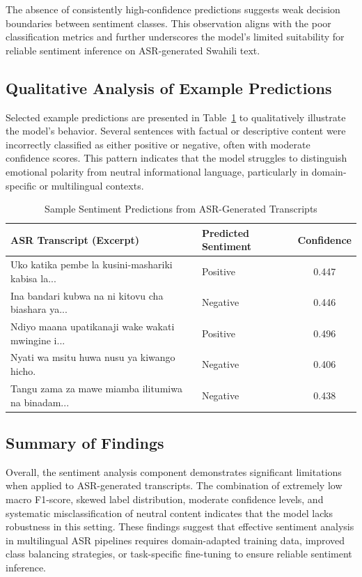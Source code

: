 The absence of consistently high-confidence predictions suggests weak decision boundaries between sentiment classes. This observation aligns with the poor classification metrics and further underscores the model’s limited suitability for reliable sentiment inference on ASR-generated Swahili text.

\subsection{Qualitative Analysis of Example Predictions}

Selected example predictions are presented in Table~\ref{tab:example_predictions} to qualitatively illustrate the model’s behavior. Several sentences with factual or descriptive content were incorrectly classified as either positive or negative, often with moderate confidence scores. This pattern indicates that the model struggles to distinguish emotional polarity from neutral informational language, particularly in domain-specific or multilingual contexts.

\begin{table}[H]
\centering
\caption{Sample Sentiment Predictions from ASR-Generated Transcripts}
\label{tab:example_predictions}
\begin{tabular}{p{7cm} l c}
\hline
\textbf{ASR Transcript (Excerpt)} & \textbf{Predicted Sentiment} & \textbf{Confidence} \\
\hline
Uko katika pembe la kusini-mashariki kabisa la... & Positive & 0.447 \\
Ina bandari kubwa na ni kitovu cha biashara ya... & Negative & 0.446 \\
Ndiyo maana upatikanaji wake wakati mwingine i... & Positive & 0.496 \\
Nyati wa msitu huwa nusu ya kiwango hicho. & Negative & 0.406 \\
Tangu zama za mawe miamba ilitumiwa na binadam... & Negative & 0.438 \\
\hline
\end{tabular}
\end{table}


\subsection{Summary of Findings}

Overall, the sentiment analysis component demonstrates significant limitations when applied to ASR-generated transcripts. The combination of extremely low macro F1-score, skewed label distribution, moderate confidence levels, and systematic misclassification of neutral content indicates that the model lacks robustness in this setting. These findings suggest that effective sentiment analysis in multilingual ASR pipelines requires domain-adapted training data, improved class balancing strategies, or task-specific fine-tuning to ensure reliable sentiment inference.

